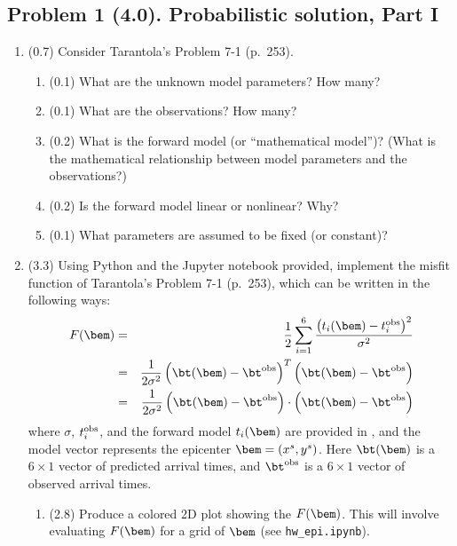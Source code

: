 \documentclass[11pt,titlepage,fleqn]{article}
\begin{document}

\pagebreak
\subsection*{Problem 1 (4.0). Probabilistic solution, Part I}

\begin{enumerate}
\item (0.7) Consider Tarantola's Problem 7-1 (p.~253).
%
\begin{enumerate}
\item (0.1) What are the unknown model parameters? How many?
\item (0.1) What are the observations? How many?
\item (0.2) What is the forward model (or ``mathematical model'')? (What is the mathematical relationship between model parameters and the observations?)
\item (0.2) Is the forward model linear or nonlinear? Why?
\item (0.1) What parameters are assumed to be fixed (or constant)?
\end{enumerate}


\item (3.3) Using Python and the Jupyter notebook provided, implement the misfit function of Tarantola's Problem 7-1 (p.~253), which can be written in the following ways:
%
\begin{eqnarray}
F(\bem) &=& \frac{1}{2} \sum_{i=1}^6 \frac{\left(t_i(\bem) - t_i^{\rm obs}\right)^2}{\sigma^2}
\\
&=& \frac{1}{2\sigma^2} \left(\bt(\bem) - \bt^{\rm obs}\right)^T \left(\bt(\bem) - \bt^{\rm obs}\right)
\\
&=& \frac{1}{2\sigma^2} \left(\bt(\bem) - \bt^{\rm obs}\right) \cdot \left(\bt(\bem) - \bt^{\rm obs}\right)
\end{eqnarray}
%
where $\sigma$, $t_i^{\rm obs}$, and the forward model $t_i(\bem)$ are provided in \citet{Tarantola2005}, and the model vector represents the epicenter $\bem = (x^s,y^s)$. Here $\bt(\bem)$ is a $6 \times 1$ vector of predicted arrival times, and $\bt^{\rm obs}$ is a $6 \times 1$ vector of observed arrival times.

\begin{enumerate}
\item (2.8) Produce a colored 2D plot showing the $F(\bem)$. This will involve evaluating $F(\bem)$ for a grid of $\bem$ (see \verb+hw_epi.ipynb+).


\end{enumerate}
\end{enumerate}
\end{document}

